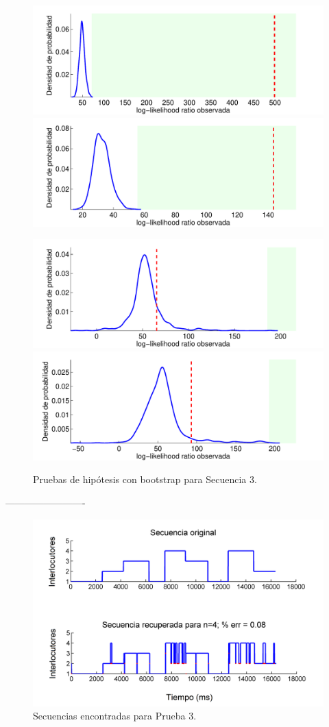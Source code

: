 \begin{figure}[H]
  \centerline  
  {\includegraphics[width=0.6\linewidth]{gfx/chap6/learboot1}
   \includegraphics[width=0.6\linewidth]{gfx/chap6/learboot2} }
  \centerline  
  {\includegraphics[width=0.6\linewidth]{gfx/chap6/learboot3}
   \includegraphics[width=0.6\linewidth]{gfx/chap6/learboot4}
  } \quad
  \caption{Pruebas de hipótesis con bootstrap para Secuencia 3.}
  \label{fig:prb1_boot}
\end{figure}

-------------------------

\begin{figure}[H]
  \centerline
  {\includegraphics[width=0.8\linewidth]{gfx/chap6/lear31_}} \quad
  \caption{Secuencias encontradas para Prueba 3.}
  \label{fig:prb1_seq}
\end{figure}

